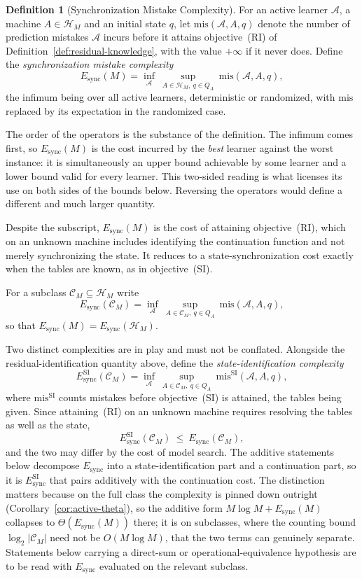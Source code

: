 \documentclass[12pt]{article}
\theoremstyle{definition}
\newtheorem{definition}[theorem]{Definition}
\newcommand{\Esync}{E_{\mathrm{sync}}}
\newcommand{\EsyncSI}{E_{\mathrm{sync}}^{\mathrm{SI}}}
\newcommand{\mistk}{\mathrm{mis}}
\begin{document}
\begin{definition}[Synchronization Mistake Complexity]
\label{def:sync-mistake-complexity}
For an active learner $\mathcal A$, a machine $A\in\mathcal H_M$ and an initial
state $q$, let $\mistk(\mathcal A,A,q)$ denote the number of prediction
mistakes $\mathcal A$ incurs before it attains objective~(RI) of
Definition~\ref{def:residual-knowledge}, with the value $+\infty$ if it never
does.  Define the \emph{synchronization mistake complexity}
\[
\Esync(M)
=
\inf_{\mathcal A}\
\sup_{A\in\mathcal H_M,\ q\in Q_A}\
\mistk(\mathcal A,A,q),
\]
the infimum being over all active learners, deterministic or randomized, with
$\mistk$ replaced by its expectation in the randomized case.

The order of the operators is the substance of the definition.  The infimum
comes first, so $\Esync(M)$ is the cost incurred by the \emph{best} learner
against the worst instance: it is simultaneously an upper bound achievable by
some learner and a lower bound valid for every learner.  This two-sided
reading is what licenses its use on both sides of the bounds below.  Reversing
the operators would define a different and much larger quantity.

Despite the subscript, $\Esync(M)$ is the cost of attaining
objective~(RI), which on an unknown machine includes identifying the
continuation function and not merely synchronizing the state.  It reduces to a
state-synchronization cost exactly when the tables are known, as in
objective~(SI).

For a subclass $\mathcal C_M\subseteq\mathcal H_M$ write
\[
\Esync(\mathcal C_M)
=
\inf_{\mathcal A}\
\sup_{A\in\mathcal C_M,\ q\in Q_A}\
\mistk(\mathcal A,A,q),
\]
so that $\Esync(M)=\Esync(\mathcal H_M)$.

Two distinct complexities are in play and must not be conflated.  Alongside the
residual-identification quantity above, define the
\emph{state-identification complexity}
\[
\EsyncSI(\mathcal C_M)
=
\inf_{\mathcal A}\
\sup_{A\in\mathcal C_M,\ q\in Q_A}\
\mistk^{\mathrm{SI}}(\mathcal A,A,q),
\]
where $\mistk^{\mathrm{SI}}$ counts mistakes before objective~(SI) is attained,
the tables being given.  Since attaining~(RI) on an unknown machine requires
resolving the tables as well as the state,
\[
\EsyncSI(\mathcal C_M)\ \le\ \Esync(\mathcal C_M),
\]
and the two may differ by the cost of model search.  The additive statements
below decompose $\Esync$ into a state-identification part and a continuation
part, so it is $\EsyncSI$ that pairs additively with the continuation cost.
The distinction matters because on
the full class the complexity is pinned down outright
(Corollary~\ref{cor:active-theta}), so the additive form
$M\log M+\Esync(M)$ collapses to $\Theta(\Esync(M))$ there; it is on
subclasses, where the counting bound $\log_2|\mathcal C_M|$ need not be
$O(M\log M)$, that the two terms can genuinely separate.  Statements below
carrying a direct-sum or operational-equivalence hypothesis are to be read with
$\Esync$ evaluated on the relevant subclass.
\end{definition}
\end{document}
